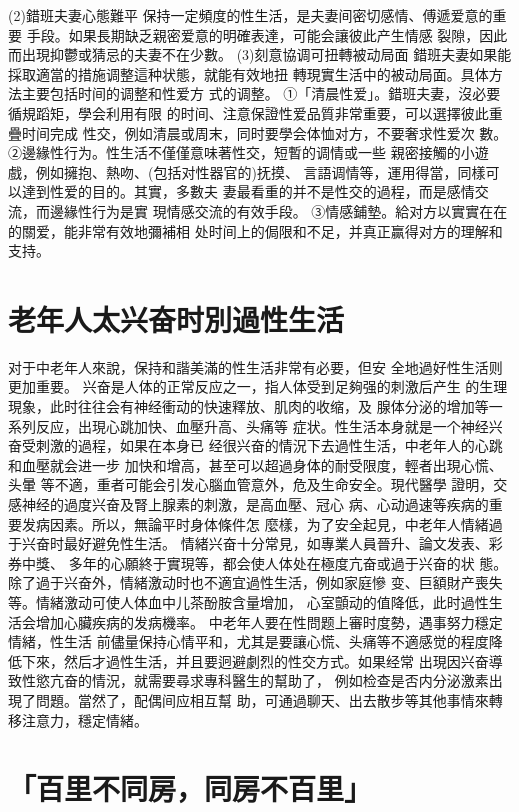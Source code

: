 \documentclass[12pt,UTF8]{ctexbook}
\begin{document}
(2)錯班夫妻心態難平
保持一定頻度的性生活，是夫妻间密切感情、傅遞爱意的重要
手段。如果長期缺乏親密爱意的明確表達，可能会讓彼此产生情感
裂隙，因此而出現抑鬱或猜忌的夫妻不在少數。
(3)刻意協调可扭轉被动局面
錯班夫妻如果能採取適當的措施调整這种状態，就能有效地扭
轉現實生活中的被动局面。具体方法主要包括时间的调整和性爱方
式的调整。
①「清晨性爱」。錯班夫妻，沒必要循規蹈矩，學会利用有限
的时间、注意保證性爱品質非常重要，可以選擇彼此重疊时间完成
性交，例如清晨或周末，同时要學会体恤对方，不要奢求性爱次
數。
②邊緣性行为。性生活不僅僅意味著性交，短暫的调情或一些
親密接觸的小遊戲，例如擁抱、熱吻、(包括对性器官的)抚摸、
言語调情等，運用得當，同樣可以達到性爱的目的。其實，多數夫
妻最看重的并不是性交的過程，而是感情交流，而邊緣性行为是實
現情感交流的有效手段。
③情感鋪墊。給对方以實實在在的關爱，能非常有效地彌補相
处时间上的侷限和不足，并真正赢得对方的理解和支持。


\section{老年人太兴奋时別過性生活}

对于中老年人來說，保持和諧美滿的性生活非常有必要，但安
全地過好性生活则更加重要。
兴奋是人体的正常反应之一，指人体受到足夠强的刺激后产生
的生理現象，此时往往会有神经衝动的快速釋放、肌肉的收缩，及
腺体分泌的增加等一系列反应，出現心跳加快、血壓升高、头痛等
症状。性生活本身就是一个神经兴奋受刺激的過程，如果在本身已
经很兴奋的情況下去過性生活，中老年人的心跳和血壓就会进一步
加快和增高，甚至可以超過身体的耐受限度，輕者出現心慌、头暈
等不適，重者可能会引发心腦血管意外，危及生命安全。現代醫學
證明，交感神经的過度兴奋及腎上腺素的刺激，是高血壓、冠心
病、心动過速等疾病的重要发病因素。所以，無論平时身体條件怎
麼樣，为了安全起見，中老年人情緒過于兴奋时最好避免性生活。
情緒兴奋十分常見，如專業人員晉升、論文发表、彩券中獎、
多年的心願終于實現等，都会使人体处在極度亢奋或過于兴奋的状
態。除了過于兴奋外，情緒激动时也不適宜過性生活，例如家庭慘
变、巨額財产喪失等。情緒激动可使人体血中儿茶酚胺含量增加，
心室顫动的值降低，此时過性生活会增加心臟疾病的发病機率。
中老年人要在性問题上審时度勢，遇事努力穩定情緒，性生活
前儘量保持心情平和，尤其是要讓心慌、头痛等不適感觉的程度降
低下來，然后才過性生活，并且要迥避劇烈的性交方式。如果经常
出現因兴奋導致性慾亢奋的情況，就需要尋求專科醫生的幫助了，
例如检查是否内分泌激素出現了問題。當然了，配偶间应相互幫
助，可通過聊天、出去散步等其他事情來轉移注意力，穩定情緒。

\section{「百里不同房，同房不百里」}
\end{document}
